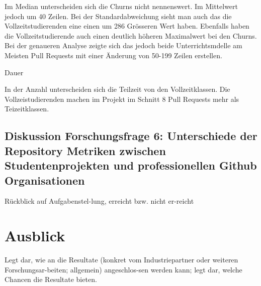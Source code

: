 Im Median unterscheiden sich die Churns nicht nennenswert. Im Mittelwert jedoch um 40 Zeilen. Bei der Standardabweichung sieht man auch das die Vollzeitstudierenden eine einen um 286 Grösseren Wert haben. Ebenfalls haben die Vollzeitstudierende auch einen deutlich höheren Maximalwert bei den Churns. Bei der genaueren Analyse zeigte sich das jedoch beide Unterrichtsmdelle am Meisten Pull Requests mit einer Änderung von 50-199 Zeilen erstellen.  

Dauer

In der Anzahl unterscheiden sich die Teilzeit von den Vollzeitklassen. Die Vollzeistudierenden machen im Projekt im Schnitt 8 Pull Requests mehr als Teizeitklassen. 
\subsection{Diskussion Forschungsfrage 6: Unterschiede der Repository Metriken zwischen Studentenprojekten und professionellen Github Organisationen}


Rückblick auf Aufgabenstel-lung, erreicht bzw. nicht er-reicht

\section{Ausblick}
Legt dar, wie an die Resultate (konkret vom Industriepartner oder weiteren Forschungsar-beiten; allgemein) angeschlos-sen werden kann; legt dar, welche Chancen die Resultate bieten.




